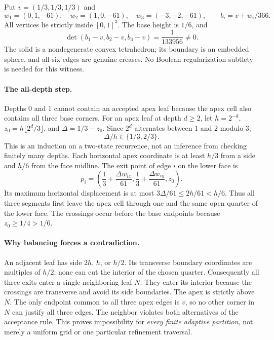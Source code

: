 \documentclass[11pt]{article}
\begin{document}
Put $v=(1/3,1/3,1/3)$ and
\[
 w_1=(0,1,-61),\quad w_2=(1,0,-61),\quad
 w_3=(-3,-2,-61),\qquad b_i=v+w_i/366.
\]
All vertices lie strictly inside $[0,1]^3$. The base height is $1/6$,
and
\[
 \det(b_1-v,b_2-v,b_3-v)=\frac{1}{133956}\ne0.
\]
The solid is a nondegenerate convex tetrahedron; its boundary is an
embedded sphere, and all six edges are genuine creases. No Boolean
regularization subtlety is needed for this witness.

\paragraph{The all-depth step.}
Depths $0$ and $1$ cannot contain an accepted apex leaf because the
apex cell also contains all three base corners. For an apex leaf at
depth $d\ge2$, let $h=2^{-d}$, $z_0=h\lfloor 2^d/3\rfloor$, and
$\Delta=1/3-z_0$. Since $2^d$ alternates between $1$ and $2$ modulo $3$,
\[
 \Delta/h\in\{1/3,2/3\}.
\]
This is an induction on a two-state recurrence, not an inference from
checking finitely many depths. Each horizontal apex coordinate is at
least $h/3$ from a side and $h/6$ from the face midline. The exit point
of edge $i$ on the lower face is
\[
 p_i=\left(\frac13+\frac{\Delta w_{ix}}{61},
            \frac13+\frac{\Delta w_{iy}}{61},z_0\right).
\]
Its maximum horizontal displacement is at most
$3\Delta/61\le2h/61<h/6$. Thus all three segments first leave the apex
cell through one and the same open quarter of the lower face.
The crossings occur before the base endpoints because
$z_0\ge1/4>1/6$.

\paragraph{Why balancing forces a contradiction.}
An adjacent leaf has side $2h$, $h$, or $h/2$. Its transverse boundary
coordinates are multiples of $h/2$; none can cut the interior of the
chosen quarter. Consequently all three exits enter a single neighboring
leaf $N$. They enter its interior because the crossings are transverse
and avoid its side boundaries. The apex is strictly above $N$.
The only endpoint common to all three apex edges is $v$, so no other
corner in $N$ can justify all three edges. The neighbor violates both
alternatives of the acceptance rule. This proves impossibility for
\emph{every finite adaptive partition}, not merely a uniform grid or
one particular refinement traversal.
\end{document}
